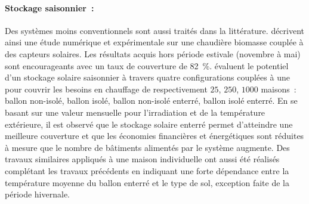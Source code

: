 \paragraph{Stockage saisonnier~:} %
\label{par:stockage_saisonnier}
Des systèmes moins conventionnels sont aussi traités dans la littérature.
\textcite{Hartl2012623} décrivent ainsi une étude numérique et expérimentale sur une
chaudière biomasse couplée à des capteurs solaires. Les résultats acquis hors période
estivale (novembre à mai) sont encourageants avec un taux de couverture de
\SI{82}{\percent}. \textcite{Ucar20082532} évaluent le potentiel d’un stockage
solaire saisonnier à travers quatre configurations couplées à une  pour couvrir les
besoins en chauffage de respectivement $25$, $250$, $1000$ maisons~: ballon non-isolé,
ballon isolé, ballon non-isolé enterré, ballon isolé enterré. En se basant sur une
valeur mensuelle pour l’irradiation et de la température extérieure, il est observé que
le stockage solaire enterré permet d’atteindre une meilleure couverture et que les
économies financières et énergétiques sont réduites à mesure que le nombre de bâtiments
alimentés par le système augmente. Des travaux similaires appliqués à une maison
individuelle ont aussi été réalisés \parencite{Yumrutas2012983} complétant les travaux
précédents en indiquant une forte dépendance entre la température moyenne du ballon enterré
et le type de sol, exception faite de la période hivernale.


